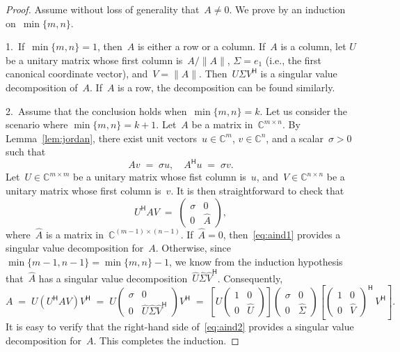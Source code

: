 \documentclass[11pt,a4paper]{article}
\theoremstyle{definition}
\def\CC{\mathbb{C}}
\newcommand{\hmt}{{\scriptscriptstyle{{\mathsf{H}}}}}
\newcommand{\ie}{{i.e.}}
\begin{document}
\begin{proof}
  Assume without loss of generality that~$A\neq 0$. We prove by an induction on~$\min\{m,n\}$.

  1.~If~$\min\{m, n\} = 1$, then~$A$ is either a row or a column. If~$A$ is a column, let
  $U$ be a unitary matrix whose first column is~$A/\|A\|$, $\Sigma = e_1$ (\ie, the first canonical
  coordinate vector), and~$V = \|A\|$. Then~$U\Sigma V^\hmt$ is a singular value decomposition
  of~$A$. If~$A$ is a row, the decomposition can be found similarly.

  2.~Assume that the conclusion holds when~$\min\{m,n\}= k$. Let us consider the scenario where 
  $\min\{m,n\} = k+1$. Let~$A$ be a matrix in~$\CC^{m\times n}$. 
  By Lemma~\ref{lem:jordan},
  there exist unit vectors~$u\in\CC^{m}$, $v\in\CC^{n}$, and a scalar~$\sigma>0$ such that 
  \begin{equation}
    \label{eq:jordan}
    Av \;=\; \sigma u, \quad A^\hmt u\;=\;\sigma v.
  \end{equation}
  Let~$U\in \CC^{m\times m}$ be a unitary matrix whose fist column is~$u$, and~$V\in\CC^{n\times n}$
  be a unitary matrix whose first column is~$v$. It is then straightforward to check that
  \begin{equation}
    \label{eq:aind1}
    U^\hmt A V \;=\; 
    \begin{pmatrix}
      \sigma & 0\\
      0 & \hat{A}
    \end{pmatrix},
  \end{equation}
  where~$\hat{A}$ is a matrix in~$\CC^{(m-1)\times (n-1)}$. If~$\hat{A} = 0$, then~\eqref{eq:aind1} 
  provides a singular value decomposition for~$A$. 
  Otherwise, since~$\min\{m-1, n-1\} = \min\{m,n\}-1$, we
  know from the induction hypothesis that~$\hat{A}$ has a singular value
  decomposition~$\hat{U}\hat{\Sigma} \hat{V}^\hmt$. Consequently, 
  \begin{equation}
    \label{eq:aind2}
    A \;=\; U (U^\hmt A V)V^\hmt 
    \;=\; 
    U 
    \begin{pmatrix}
    \sigma & 0\\
    0 & \hat{U}\hat{\Sigma} \hat{V}^\hmt
    \end{pmatrix}
    V^\hmt
  \;=\; 
    \left[
  U 
  \begin{pmatrix}
    1 & 0\\
    0 & \hat{U}
  \end{pmatrix}
\right]
  \begin{pmatrix}
    \sigma & 0\\
    0 & \hat{\Sigma}
  \end{pmatrix}
  \left[
  \begin{pmatrix}
    1 & 0\\
    0 & \hat{V}
  \end{pmatrix}^{\!\hmt}
  \,V^\hmt
\right].
  \end{equation}
  It is easy to verify that the right-hand side of~\eqref{eq:aind2} provides a singular value
  decomposition for~$A$. This completes the induction.
\end{proof}
\end{document}
